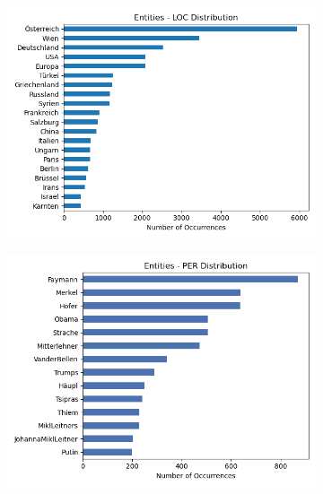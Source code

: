 \documentclass[acmsmall]{acmart}
\begin{document}
\begin{figure}[h!]
        \centering
        \begin{subfigure}[b]{0.475\textwidth}
            \centering
            \includegraphics[width=\textwidth]{assets/Entities_LOC_Distribution.png}
        \end{subfigure}
        \begin{subfigure}[b]{0.475\textwidth}  
            \centering 
            \includegraphics[width=\textwidth]{assets/Entities_PER_Distribution.png}
        \end{subfigure}
        \begin{subfigure}[b]{0.475\textwidth}   
            \centering 

\end{subfigure}
\end{figure}
\end{document}
